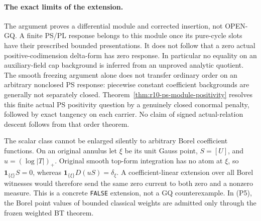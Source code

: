 \paragraph{The exact limits of the extension.}
The argument proves a differential module and corrected
insertion, not OPEN-GQ.  A finite PS/PL response belongs to
this module once its pure-cycle slots have their prescribed
bounded presentations.  It does not follow that a zero
actual positive-codimension delta-form has zero response.
In particular no equality on an auxiliary-field cap
background is inferred from an unproved analytic quotient.
The smooth freezing argument alone does not transfer ordinary
order on an arbitrary nonclosed PS response: piecewise constant
coefficient backgrounds are generally not separately closed.
Theorem~\ref{thm:r10-ps-module-positivity} resolves this finite
actual PS positivity question by a genuinely closed conormal
penalty, followed by exact tangency on each carrier.  No claim
of signed actual-relation descent follows from that order theorem.

The scalar class cannot be enlarged silently to arbitrary
Borel coefficient functions.  On an original annulus let
$\xi$ be its unit Gauss point, $S=[U]$, and
$u=(\log|T|)_+$.  Original smooth top-form integration has
no atom at $\xi$, so $\mathbf1_{\{\xi\}}S=0$, whereas
$\mathbf1_{\{\xi\}}D(uS)=\delta_\xi$.  A coefficient-linear
extension over all Borel witnesses would therefore send
the same zero current to both zero and a nonzero measure.
This is a concrete \texttt{FALSE} extension, not a GQ
counterexample.  In (P5), the Borel point values of bounded
classical weights are admitted only through the frozen
weighted BT theorem.
